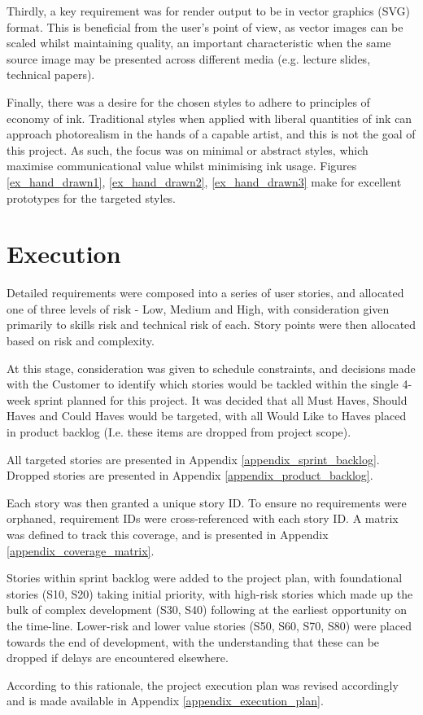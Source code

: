 Thirdly, a key requirement was for render output to be in vector graphics (SVG) format.
This is beneficial from the user's point of view, as vector images can be scaled whilst maintaining quality, an important characteristic when the same source image may be presented across different media (e.g. lecture slides, technical papers).

Finally, there was a desire for the chosen styles to adhere to principles of economy of ink.
Traditional styles when applied with liberal quantities of ink can approach photorealism in the hands of a capable artist, and this is not the goal of this project.
As such, the focus was on minimal or abstract styles, which maximise communicational value whilst minimising ink usage.
Figures \ref{ex_hand_drawn1}, \ref{ex_hand_drawn2}, \ref{ex_hand_drawn3} make for excellent prototypes for the targeted styles.

\section{Execution}\label{execution}

Detailed requirements were composed into a series of user stories, and allocated one of three levels of risk - Low, Medium and High, with consideration given primarily to skills risk and technical risk of each.
Story points were then allocated based on risk and complexity.

At this stage, consideration was given to schedule constraints, and decisions made with the Customer to identify which stories would be tackled within the single 4-week sprint planned for this project.
It was decided that all Must Haves, Should Haves and Could Haves would be targeted, with all Would Like to Haves placed in product backlog (I.e. these items are dropped from project scope).

All targeted stories are presented in Appendix \ref{appendix_sprint_backlog}. Dropped stories are presented in Appendix \ref{appendix_product_backlog}.

Each story was then granted a unique story ID. To ensure no requirements were orphaned, requirement IDs were cross-referenced with each story ID. 
A matrix was defined to track this coverage, and is presented in Appendix \ref{appendix_coverage_matrix}.

Stories within sprint backlog were added to the project plan, with foundational stories (S10, S20) taking initial priority, with high-risk stories which made up the bulk of complex development (S30, S40) following at the earliest opportunity on the time-line. 
Lower-risk and lower value stories (S50, S60, S70, S80) were placed towards the end of development, with the understanding that these can be dropped if delays are encountered elsewhere.

According to this rationale, the project execution plan was revised accordingly and is made available in Appendix \ref{appendix_execution_plan}.